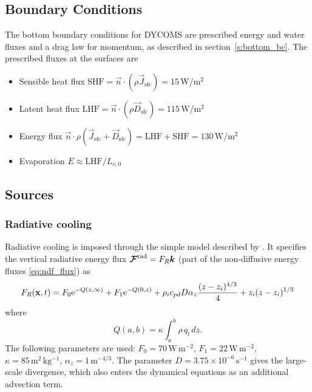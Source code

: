 \documentclass{report}
\begin{document}
\subsection{Boundary Conditions}

The bottom boundary conditions for DYCOMS are prescribed energy and water fluxes and a drag law for momentum, as described in section~\ref{s:bottom_bc}. The prescribed fluxes at the surfaces are
\begin{itemize} 
\item Sensible heat flux $\mathrm{SHF} = \vec{n} \cdot (\rho \vec{J}_{\mathrm{sfc}}) = 15\,\mathrm{W/m^2}$
\item Latent heat flux $\mathrm{LHF} = \vec{n} \cdot (\rho \vec{D}_{\mathrm{sfc}}) = 115\,\mathrm{W/m^2}$
\item Energy flux $\vec{n} \cdot \rho (\vec{J}_{\mathrm{sfc}} + \vec{D}_{\mathrm{sfc}}) = \mathrm{LHF + SHF} = 130\,\mathrm{W/m^2}$
\item Evaporation $E \approx \mathrm{LHF}/L_{v,0}$
\end{itemize}

\subsection{Sources}

\subsubsection{Radiative cooling}
Radiative cooling is imposed through the simple model described by \cite{Stevens05a}. It specifies the vertical radiative energy flux $\boldsymbol{{\mathcal{F}}}^{\mathrm{rad}} = F_R \boldsymbol{{k}}$ (part of the non-diffusive energy fluxes \eqref{eq:ndf_flux}) as
\begin{equation}
    \label{e:radiativeStevens05}
    F_{R}({\bf x}, t) = F_0{\rm e}^{-Q(z,\infty)} +
    F_1{\rm e}^{-Q(0, z)} +
    \rho_i c_{pd} D \alpha_z\frac{(z-z_i)^{4/3}}{4} + z_i(z - z_i)^{1/3}
\end{equation}
where 
\begin{equation}
    Q(a,b) = \kappa\int_{a}^{b}\rho\,q_l\,dz.
\end{equation}
The following parameters are used:
$F_0=70\,\mathrm{W\,m^{-2}}$, $F_1=22\,\mathrm{W\,m^{-2}}$, $\kappa=85\,\mathrm{m^2\,kg^{-1}}$, $\alpha_z=1\,\mathrm{m^{-4/3}}$. The parameter $D=3.75\times 10^{-6}\,\mathrm{s^{-1}}$ gives the large-scale divergence, which also enters the dynamical equations as an additional advection term.  
\end{document}
